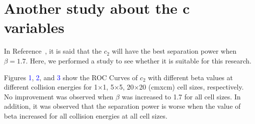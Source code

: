 \documentclass[final,1p,11pt]{elsarticle}
\begin{document}
\section*{Another study about the c variables}


In Reference~\cite{Larkoski:2013eya}, it is said that the $c_2$ will have the best separation power when $\beta = 1.7$. Here, we performed a study to see whether it is suitable for this research.

Figures \textcolor{blue}{1}, \textcolor{blue}{2}, and \textcolor{blue}{3} show the ROC Curves of $c_2$ with different beta values at different collision energies for 1$\times$1, 5$\times$5, 20$\times$20 (cmxcm) cell sizes, respectively. No improvement was observed when $\beta$ was increased to 1.7 for all cell sizes. In addition, it was observed that the separation power is worse when the value of beta increased for all collision energies at all cell sizes.
\label{sec:c_variables_study}
\end{document}
